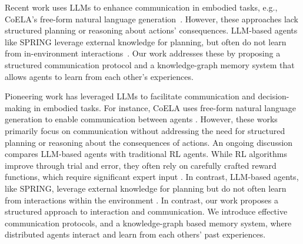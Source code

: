 Recent work uses LLMs to enhance communication in embodied tasks, e.g., CoELA’s free-form natural language generation~\cite{zhang2023building}. However, these approaches lack structured planning or reasoning about actions’ consequences. LLM-based agents like SPRING leverage external knowledge for planning, but often do not learn from in-environment interactions~\cite{wu2024spring}.  Our work addresses these by proposing a structured communication protocol and a knowledge-graph memory system that allows agents to learn from each other’s experiences.





\iffalse

Pioneering work has leveraged LLMs to facilitate communication and decision-making in embodied tasks. For instance, CoELA uses free-form natural language generation to enable communication between agents \cite{zhang2023building}. However, these works primarily focus on communication without addressing the need for structured planning or reasoning about the consequences of actions.
An ongoing discussion compares LLM-based agents with traditional RL agents. While RL algorithms improve through trial and error, they often rely on carefully crafted reward functions, which require significant expert input \cite{hafner2021benchmarking}. In contrast, LLM-based agents, like SPRING, leverage external knowledge for planning but do not often learn from interactions within the environment \cite{wu2024spring}.
In contrast, our work proposes a structured approach to interaction and communication. We introduce effective communication protocols, %
and a knowledge-graph based memory system, where distributed agents interact and learn from each others' past experiences. %

